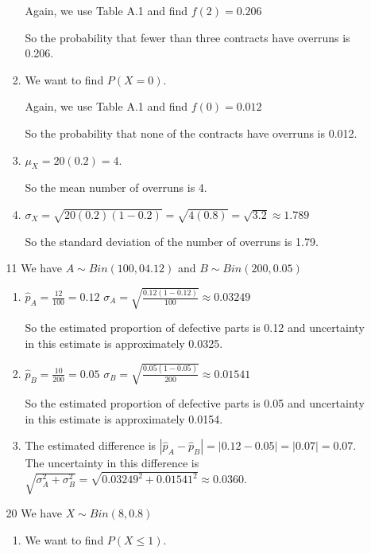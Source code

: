 \documentclass[12pt,letterpaper]{article}
\begin{document}
\begin{enumerate}
\begin{enumerate}
\begin{enumerate}[label=(\arabic*)]
              Again, we use Table A.1 and find $f(2) = 0.206$

              So the probability that fewer than three contracts have overruns is 0.206.
            \item
              We want to find $P(X = 0)$.

              Again, we use Table A.1 and find $f(0) = 0.012$

              So the probability that none of the contracts have overruns is 0.012.
            \item
              $\mu_X = 20(0.2) = 4$.

              So the mean number of overruns is 4.
            \item
              $\sigma_X = \sqrt{20(0.2)(1 - 0.2)} = \sqrt{4(0.8)} = \sqrt{3.2} \approx 1.789$

              So the standard deviation of the number of overruns is 1.79.
          \end{enumerate}
        \item [11]
          We have $A \sim Bin(100, 04.12)$ and $B \sim Bin(200, 0.05)$
          \begin{enumerate}[label=(\arabic*)]
            \item

              $\hat{p}_A = \frac{12}{100} = 0.12$
              $\sigma_A = \sqrt{\frac{0.12(1 - 0.12)}{100}} \approx 0.03249$

              So the estimated proportion of defective parts is 0.12
              and uncertainty in this estimate is approximately 0.0325.
            \item

              $\hat{p}_B = \frac{10}{200} = 0.05$
              $\sigma_B = \sqrt{\frac{0.05(1 - 0.05)}{200}} \approx 0.01541$

              So the estimated proportion of defective parts is 0.05
              and uncertainty in this estimate is approximately 0.0154.
            \item

              The estimated difference is $|\hat{p}_A - \hat{p}_B| = |0.12 - 0.05| = |0.07| = 0.07$.
              The uncertainty in this difference is $\sqrt{\sigma_A^2 + \sigma_B^2} = \sqrt{0.03249^2 + 0.01541^2} \approx 0.0360$.
          \end{enumerate}
        \item [20]
          We have $X \sim Bin(8, 0.8)$
          \begin{enumerate}[label=(\arabic*)]
            \item
              We want to find $P(X \le 1)$.


\end{enumerate}
\end{enumerate}
\end{enumerate}
\end{document}
